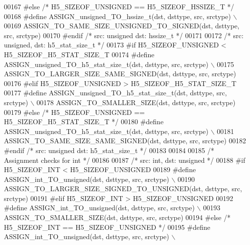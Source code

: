 \begin{DoxyCode}
00167 \textcolor{preprocessor}{#else }\textcolor{comment}{/* H5\_SIZEOF\_UNSIGNED == H5\_SIZEOF\_HSSIZE\_T */}\textcolor{preprocessor}{}
00168 \textcolor{preprocessor}{    #define ASSIGN\_unsigned\_TO\_hssize\_t(dst, dsttype, src, srctype) \(\backslash\)}
00169 \textcolor{preprocessor}{        ASSIGN\_TO\_SAME\_SIZE\_UNSIGNED\_TO\_SIGNED(dst, dsttype, src, srctype)}
00170 \textcolor{preprocessor}{#endif }\textcolor{comment}{/* src: unsigned dst: hssize\_t */}\textcolor{preprocessor}{}
00171 
00172 \textcolor{comment}{/* src: unsigned, dst: h5\_stat\_size\_t */}
00173 \textcolor{preprocessor}{#if H5\_SIZEOF\_UNSIGNED < H5\_SIZEOF\_H5\_STAT\_SIZE\_T}
00174 \textcolor{preprocessor}{    #define ASSIGN\_unsigned\_TO\_h5\_stat\_size\_t(dst, dsttype, src, srctype) \(\backslash\)}
00175 \textcolor{preprocessor}{        ASSIGN\_TO\_LARGER\_SIZE\_SAME\_SIGNED(dst, dsttype, src, srctype)}
00176 \textcolor{preprocessor}{#elif H5\_SIZEOF\_UNSIGNED > H5\_SIZEOF\_H5\_STAT\_SIZE\_T}
00177 \textcolor{preprocessor}{    #define ASSIGN\_unsigned\_TO\_h5\_stat\_size\_t(dst, dsttype, src, srctype) \(\backslash\)}
00178 \textcolor{preprocessor}{        ASSIGN\_TO\_SMALLER\_SIZE(dst, dsttype, src, srctype)}
00179 \textcolor{preprocessor}{#else }\textcolor{comment}{/* H5\_SIZEOF\_UNSIGNED == H5\_SIZEOF\_H5\_STAT\_SIZE\_T */}\textcolor{preprocessor}{}
00180 \textcolor{preprocessor}{    #define ASSIGN\_unsigned\_TO\_h5\_stat\_size\_t(dst, dsttype, src, srctype) \(\backslash\)}
00181 \textcolor{preprocessor}{        ASSIGN\_TO\_SAME\_SIZE\_SAME\_SIGNED(dst, dsttype, src, srctype)}
00182 \textcolor{preprocessor}{#endif }\textcolor{comment}{/* src: unsigned dst: h5\_stat\_size\_t */}\textcolor{preprocessor}{}
00183 
00184 
00185 \textcolor{comment}{/* Assignment checks for int */}
00186 
00187 \textcolor{comment}{/* src: int, dst: unsigned */}
00188 \textcolor{preprocessor}{#if H5\_SIZEOF\_INT < H5\_SIZEOF\_UNSIGNED}
00189 \textcolor{preprocessor}{    #define ASSIGN\_int\_TO\_unsigned(dst, dsttype, src, srctype) \(\backslash\)}
00190 \textcolor{preprocessor}{        ASSIGN\_TO\_LARGER\_SIZE\_SIGNED\_TO\_UNSIGNED(dst, dsttype, src, srctype)}
00191 \textcolor{preprocessor}{#elif H5\_SIZEOF\_INT > H5\_SIZEOF\_UNSIGNED}
00192 \textcolor{preprocessor}{    #define ASSIGN\_int\_TO\_unsigned(dst, dsttype, src, srctype) \(\backslash\)}
00193 \textcolor{preprocessor}{        ASSIGN\_TO\_SMALLER\_SIZE(dst, dsttype, src, srctype)}
00194 \textcolor{preprocessor}{#else }\textcolor{comment}{/* H5\_SIZEOF\_INT == H5\_SIZEOF\_UNSIGNED */}\textcolor{preprocessor}{}
00195 \textcolor{preprocessor}{    #define ASSIGN\_int\_TO\_unsigned(dst, dsttype, src, srctype) \(\backslash\)}

\end{DoxyCode}

